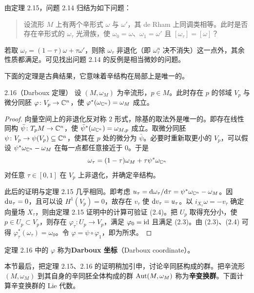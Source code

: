 由定理 2.15，问题 2.14 归结为如下问题：
\begin{quote}
  设流形 $M$ 上有两个辛形式 $\omega$ 与 $\omega'$，其 de Rham 上同调类相等。此时是否存在辛形式的 $\omega_\tau$ 光滑族，使 $\omega_0=\omega$、$\omega_1=\omega'$ 且 $[\omega_\tau]=[\omega]$？
\end{quote}

若取 $\omega_\tau=(1-\tau)\omega+\tau\omega'$，则除 $\omega_\tau$ 非退化（即 $\omega_\tau^n$ 决不消失）这一点外，其余性质都满足。可见找出问题 2.14 的反例是相当微妙的问题。

下面的定理是古典结果，它意味着辛结构在局部上是唯一的。

\begin{theorem*}{2.16}（Darboux 定理）
  设 $(M,\omega_M)$ 为辛流形，$p\in M$。此时存在 $p$ 的邻域 $V_p$ 与微分同胚 $\varphi\colon V_p\to\mathbb{C}^n$，使 $\varphi^*(\omega_{\mathbb{C}^n})=\omega_M$ 成立。
\end{theorem*}

\begin{proof}
  向量空间上的非退化反对称 2 形式，除基的取法外是唯一的。即存在线性同构 $\bar\psi\colon T_pM\to\mathbb{C}^n$，使 $\bar\psi^*(\omega_{\mathbb{C}^n})=\omega_{M,p}$ 成立。取微分同胚 $\psi\colon V_p\to\psi(V_p)\subseteq\mathbb{C}^n$，使其在 $p$ 处的微分为 $\bar\psi$。必要时重新取更小的 $V_p$，可以假设 $\psi^*\omega_{\mathbb{C}^n}-\omega_M$ 在每一点都任意接近于 0。于是
  \[
    \omega_\tau=(1-\tau)\omega_M+\tau\psi^*\omega_{\mathbb{C}^n}
  \]
  对任意 $\tau\in[0,1]$ 在 $V_p$ 上非退化，并确定辛结构。

  此后的证明与定理 2.15 几乎相同。即考虑 $u_\tau=\mathrm{d}\omega_\tau/\mathrm{d}\tau=\psi^*\omega_{\mathbb{C}^n}-\omega_M$。因 $\mathrm{d} u_\tau=0$，且可以设 $H^1(V_p)=0$，故存在 $v_\tau$ 使 $\mathrm{d} v_\tau=u_\tau$。以 $i_{X_\tau}\omega=-v_\tau$ 确定向量场 $X_\tau$，则由定理 2.15 证明中的计算可验证 (2.4)。把 $U_p$ 取得充分小，使 $p\in U_p\subset V_p$，则存在 $\varphi_\tau\colon U_p\to V_p$，满足 $\varphi_0=\mathrm{id}$ 且满足 (2.3)。由 (2.3)、(2.4) 可得 $\varphi_\tau^*(\omega_\tau)=\omega_0$。令 $\varphi=\psi\circ\varphi_1$，即为所求。
\end{proof}

定理 2.16 中的 $\varphi$ 称为\textbf{Darboux 坐标}（Darboux coordinate）。

本节最后，把定理 2.15、2.16 的证明稍加引申，讨论辛同胚构成的群。把辛流形 $(M,\omega_M)$ 到其自身的辛同胚全体构成的群 $\operatorname{Aut}(M,\omega_M)$ 称为\textbf{辛变换群}。下面计算辛变换群的 Lie 代数。

